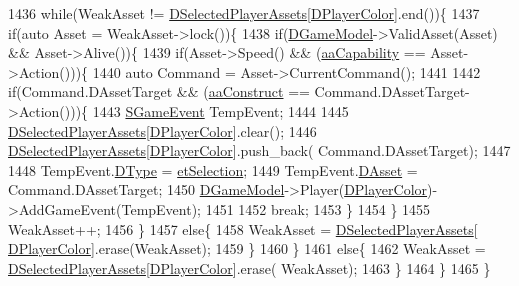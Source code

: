 \begin{DoxyCode}
1436     \textcolor{keywordflow}{while}(WeakAsset != \hyperlink{classCApplicationData_a05c1087d5a5c4ddc14fcb37444f1642b}{DSelectedPlayerAssets}[\hyperlink{classCApplicationData_a53550939b20cba70570f113e4d1c5d02}{DPlayerColor}].end())\{
1437         \textcolor{keywordflow}{if}(\textcolor{keyword}{auto} Asset = WeakAsset->lock())\{
1438             \textcolor{keywordflow}{if}(\hyperlink{classCApplicationData_a32b50c7c1cbac3cfd67c7f775b1d6fee}{DGameModel}->ValidAsset(Asset) && Asset->Alive())\{
1439                 \textcolor{keywordflow}{if}(Asset->Speed() && (\hyperlink{GameDataTypes_8h_ab47668e651a3032cfb9c40ea2d60d670acf9fb164e8abd71c71f4a8c7fda360d4}{aaCapability} == Asset->Action()))\{
1440                     \textcolor{keyword}{auto} Command = Asset->CurrentCommand();
1441                     
1442                     \textcolor{keywordflow}{if}(Command.DAssetTarget && (\hyperlink{GameDataTypes_8h_ab47668e651a3032cfb9c40ea2d60d670a7ef6b863f66dd7dcc95a199cd758ae1d}{aaConstruct} == Command.DAssetTarget->Action()))\{
1443                         \hyperlink{structSGameEvent}{SGameEvent} TempEvent;
1444                         
1445                         \hyperlink{classCApplicationData_a05c1087d5a5c4ddc14fcb37444f1642b}{DSelectedPlayerAssets}[\hyperlink{classCApplicationData_a53550939b20cba70570f113e4d1c5d02}{DPlayerColor}].clear();
1446                         \hyperlink{classCApplicationData_a05c1087d5a5c4ddc14fcb37444f1642b}{DSelectedPlayerAssets}[\hyperlink{classCApplicationData_a53550939b20cba70570f113e4d1c5d02}{DPlayerColor}].push\_back(
      Command.DAssetTarget);
1447                         
1448                         TempEvent.\hyperlink{structSGameEvent_afa10562e243f4ac2b473b655cc58fee7}{DType} = \hyperlink{GameModel_8h_abfcf510bafec7c6429906a6ecaac656da38393c2ecd9404ab15f2f9bb5aab0497}{etSelection};
1449                         TempEvent.\hyperlink{structSGameEvent_a40c85eeac83b96887b7449c9bdc5d624}{DAsset} = Command.DAssetTarget;
1450                         \hyperlink{classCApplicationData_a32b50c7c1cbac3cfd67c7f775b1d6fee}{DGameModel}->Player(\hyperlink{classCApplicationData_a53550939b20cba70570f113e4d1c5d02}{DPlayerColor})->AddGameEvent(TempEvent);
1451                                 
1452                         \textcolor{keywordflow}{break};
1453                     \}
1454                 \}
1455                 WeakAsset++;
1456             \}
1457             \textcolor{keywordflow}{else}\{
1458                 WeakAsset = \hyperlink{classCApplicationData_a05c1087d5a5c4ddc14fcb37444f1642b}{DSelectedPlayerAssets}[
      \hyperlink{classCApplicationData_a53550939b20cba70570f113e4d1c5d02}{DPlayerColor}].erase(WeakAsset);   
1459             \}
1460         \}
1461         \textcolor{keywordflow}{else}\{
1462             WeakAsset = \hyperlink{classCApplicationData_a05c1087d5a5c4ddc14fcb37444f1642b}{DSelectedPlayerAssets}[\hyperlink{classCApplicationData_a53550939b20cba70570f113e4d1c5d02}{DPlayerColor}].erase(
      WeakAsset);   
1463         \}
1464     \}
1465 \}
\end{DoxyCode}
